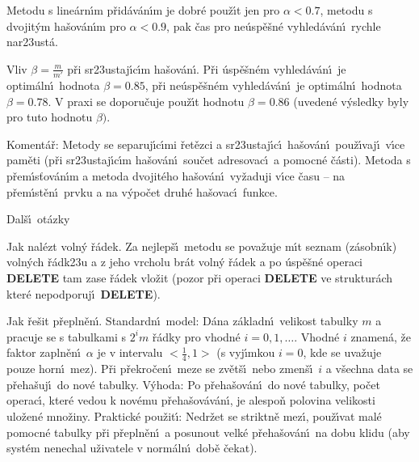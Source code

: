 \flushpar Metodu s line\'arn\'\i m p\v rid\'av\'an\'\i m je dobr\'e pou\v z\'\i t jen pro 
$\alpha <0.7$, metodu s dvojit\'ym ha\v sov\'an\'\i m pro $\alpha 
<0.9$, pak 
\v cas pro ne\'usp\v e\v sn\'e vyhled\'av\'an\'\i\ rychle nar\accent23ust\'a.
\medskip

\flushpar Vliv $\beta =\frac m{m'}$ p\v ri sr\accent23ustaj\'\i c\'\i m ha\v sov\'an\'\i .\newline 
P\v ri 
\'usp\v e\v sn\'em vy\-hled\'av\'an\'\i\ je optim\'aln\'\i\ hodnota $
\beta =0.85$, p\v ri 
ne\'usp\v e\v sn\'em vy\-hled\'av\'an\'\i\ je optim\'aln\'\i\ hodnota $
\beta =0.78$. 
V praxi se doporu\v cuje pou\v z\'\i t hodnotu $\beta =0.86$ (uveden\'e 
v\'ysledky byly pro tuto hodnotu $\beta ).$
\medskip

\flushpar Koment\'a\v r: Metody se separuj\'\i c\'\i mi \v ret\v ezci a 
sr\accent23ustaj\'\i c\'\i\ ha\v sov\'an\'\i\ pou\v z\'\i vaj\'\i\ v\'\i ce pam\v eti (p\v ri 
sr\accent23ustaj\'\i c\'\i m ha\v sov\'an\'\i\ sou\v cet adresovac\'\i\ a 
pomocn\'e \v c\'asti). Metoda s p\v rem\'\i s\v tov\'an\'\i m a metoda 
dvojit\'eho ha\v sov\'an\'\i\ vy\v zaduji v\'\i ce \v casu -- na p\v rem\'\i st\v en\'\i\ 
prvku a na v\'ypo\v cet druh\'e ha\v sovac\'\i\ funkce.

\heading
Dal\v s\'\i\ ot\'azky
\endheading

\flushpar Jak nal\'ezt voln\'y \v r\'adek.\newline 
Za nejlep\v s\'\i\ metodu se pova\v zuje m\'\i t seznam (z\'asobn\'\i k) 
voln\'ych \v r\'adk\accent23u a z jeho vrcholu br\'at voln\'y \v r\'adek 
a po \'usp\v e\v sn\'e operaci {\bf DELETE} tam zase \v r\'adek vlo\v zit 
(pozor p\v ri operaci {\bf DELETE} ve struktur\'ach kter\'e 
nepodporuj\'\i\ {\bf DELETE}).
\medskip

\flushpar Jak \v re\v sit p\v repln\v en\'\i .\newline 
Standardn\'\i\ model: D\'ana z\'akladn\'\i\ velikost tabulky $m$ a 
pracuje se s tabulkami s $2^im$ \v r\'adky pro vhodn\'e 
$i=0,1,\dots$. Vhodn\'e $i$ znamen\'a, \v ze faktor zapln\v en\'\i\ $
\alpha$ je v 
intervalu $<\frac 14,1>$ (s vyj\'\i mkou $i=0$, kde se uva\v zuje 
pouze horn\'\i\ mez). P\v ri p\v rekro\-\v ce\-n\'\i\ meze se zv\v et\v s\'\i\ nebo 
zmen\v s\'\i\ $i$ a v\v sechna data se p\v reha\v suj\'\i\ do nov\'e 
tabulky.\newline 
V\'yhoda: Po p\v reha\v sov\'an\'\i\ do nov\'e tabulky, po\v cet operac\'\i , 
kter\'e vedou k nov\'emu p\v reha\v sov\'a\-v\'a\-n\'\i , je alespo\v n polovina 
velikosti ulo\v zen\'e mno\v ziny.\newline 
Praktick\'e pou\v zit\'\i : Nedr\v zet se striktn\v e mez\'\i , pou\v z\'\i vat 
mal\'e pomocn\'e ta\-bul\-ky p\v ri p\v repln\v en\'\i\ a posunout velk\'e 
p\v reha\v sov\'an\'\i\ na dobu klidu (aby syst\'em nenechal u\v zivatele v 
norm\'aln\'\i\ dob\v e \v cekat).
\medskip

